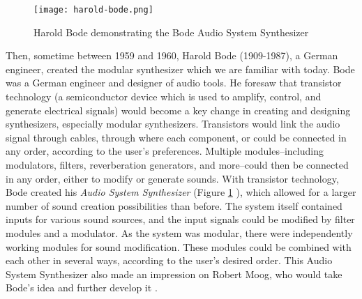 \begin{figure}
  \centering
  \texttt{[image: harold-bode.png]}
  \caption{Harold Bode demonstrating the Bode Audio System Synthesizer}
  \label{fig:harold-bode}
\end{figure}


Then, sometime between 1959 and 1960, Harold Bode (1909-1987), a German engineer, created the modular synthesizer which we are familiar with today. Bode was a German engineer and designer of audio tools. He foresaw that transistor technology (a semiconductor device which is used to amplify, control, and generate electrical signals) would become a key change in creating and designing synthesizers, especially modular synthesizers\cite{Gabrielli_2020}. Transistors would link the audio signal through cables, through where each component, or  could be connected in any order, according to the user's preferences. Multiple modules--including modulators, filters, reverberation generators, and more--could then be connected in any order, either to modify or generate sounds. With transistor technology, Bode created his \textit{Audio System Synthesizer} (Figure \ref{fig:harold-bode} \cite{Crab_2019b}), which allowed for a larger number of sound creation possibilities than before. The system itself contained inputs for various sound sources, and the input signals could be modified by filter modules and a modulator\cite{Bode_1984}. As the system was modular, there were independently working modules for sound modification. These modules could be combined with each other in several ways, according to the user's desired order. This Audio System Synthesizer also made an impression on Robert Moog, who would take Bode's idea and further develop it \cite{Gabrielli_2020}. 

